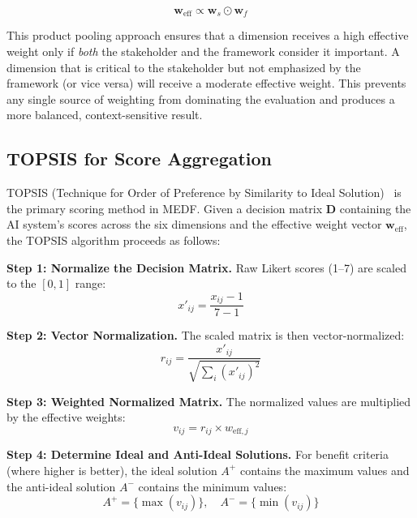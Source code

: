 \begin{equation}
  \mathbf{w}_{\mathrm{eff}} \propto \mathbf{w}_s \odot \mathbf{w}_f
  \label{eq:effective_weights}
\end{equation}

This product pooling approach ensures that a dimension receives a high effective weight only if \textit{both} the stakeholder and the framework consider it important. A dimension that is critical to the stakeholder but not emphasized by the framework (or vice versa) will receive a moderate effective weight. This prevents any single source of weighting from dominating the evaluation and produces a more balanced, context-sensitive result.

\subsection{TOPSIS for Score Aggregation}
\label{sec:topsis_algo}

TOPSIS (Technique for Order of Preference by Similarity to Ideal Solution)~\cite{hwang1981mcdm,behzadian2012topsis} is the primary scoring method in MEDF. Given a decision matrix $\mathbf{D}$ containing the AI system's scores across the six dimensions and the effective weight vector $\mathbf{w}_{\mathrm{eff}}$, the TOPSIS algorithm proceeds as follows:

\textbf{Step 1: Normalize the Decision Matrix.} Raw Likert scores (1--7) are scaled to the $[0, 1]$ range:
\begin{equation}
  x'_{ij} = \frac{x_{ij} - 1}{7 - 1}
  \label{eq:normalize}
\end{equation}

\textbf{Step 2: Vector Normalization.} The scaled matrix is then vector-normalized:
\begin{equation}
  r_{ij} = \frac{x'_{ij}}{\sqrt{\sum_{i} (x'_{ij})^2}}
  \label{eq:vector_norm}
\end{equation}

\textbf{Step 3: Weighted Normalized Matrix.} The normalized values are multiplied by the effective weights:
\begin{equation}
  v_{ij} = r_{ij} \times w_{\mathrm{eff},j}
  \label{eq:weighted}
\end{equation}

\textbf{Step 4: Determine Ideal and Anti-Ideal Solutions.} For benefit criteria (where higher is better), the ideal solution $A^+$ contains the maximum values and the anti-ideal solution $A^-$ contains the minimum values:
\begin{equation}
  A^+ = \{\max(v_{ij})\}, \quad A^- = \{\min(v_{ij})\}
  \label{eq:ideal}
\end{equation}

